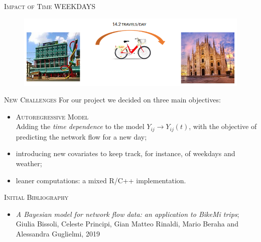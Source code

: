 \documentclass{beamer}
\begin{document}
\begin{frame}{\textsc{Impact of Time}}
WEEKDAYS
\begin{figure}[H]
	\centering
	\includegraphics[width=\linewidth]{pictures/WeekDays.png} 
	\label{fig1}
\end{figure}
\end{frame}

\begin{frame}{\textsc{New Challenges}}
For our project we decided on three main objectives:
\begin{itemize}
	\item \alert{\textsc{Autoregressive Model}}
	\\
	Adding the \emph{time dependence} to the model $Y_{ij} \rightarrow Y_{ij}(t)$, with the objective of predicting the network flow for a \alert{new day};
	\item introducing \alert{new covariates} to keep track, for instance, of \alert{weekdays} and \alert{weather};
	\item leaner computations: a \alert{mixed R/C++ implementation}.
\end{itemize}
\end{frame}

\begin{frame}{\textsc{Initial Bibliography}}
 	\begin{itemize}
 		\item \emph{A Bayesian model for network flow data:
 		an application to BikeMi trips};
 		Giulia Bissoli, Celeste Principi, Gian Matteo Rinaldi, Mario Beraha and
 		Alessandra Guglielmi, 2019
 	\end{itemize}
\end{frame}
\end{document}
